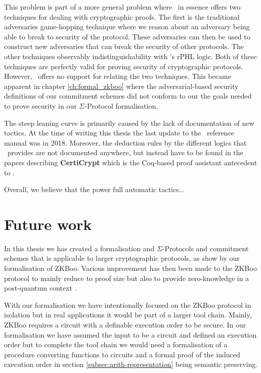 This problem is part of a more general problem where \easycrypt\ in essence
offers two techniques for dealing with cryptographic proofs. The first is the
traditional adversaries game-hopping technique where we reason about an
adversary being able to break to security of the protocol. These adversaries can
then be used to construct new adversaries that can break the security of other protocols.
The other techniques observably indistinguishability with \easycrypt's rPHL
logic.
Both of these techniques are perfectly valid for proving security of
cryptographic protocols. However, \easycrypt\ offers no support for relating the
two techniques. This became apparent in chapter \ref{ch:formal_zkboo} where the
adversarial-based security definitions of our commitment schemes did not conform
to our the goals needed to prove security in our $\Sigma$-Protocol formalisation.

The steep leaning curve is primarily caused by the lack of documentation of new
tactics. At the time of writing this thesis the last update to the \easycrypt\
reference manual \cite{ec_refman} was in 2018. Moreover, the deduction rules by
the different logics that \easycrypt\ provides are not documented anywhere, but
instead have to be found in the papers describing \textbf{CertiCrypt} which is
the Coq-based proof assistant antecedent to \easycrypt.

Overall, we believe that the power full automatic tactics...

\section{Future work}
\label{sec:future_work}
In this thesis we has created a formalisation and $\Sigma$-Protocols and
commitment schemes that is applicable to larger cryptographic protocols, as show
by our formalisation of ZKBoo. Various improvement has then been made to the
ZKBoo protocol to mainly reduce to proof size but also to provide zero-knowledge
in a post-quantum context \cite{zkb++}.

With our formalisation we have intentionally focused on the ZKBoo protocol in
isolation but in real applications it would be part of a larger tool chain.
Mainly, ZKBoo requires a circuit with a definable execution order to be secure.
In our formalisation we have assumed the input to be a circuit and defined an
execution order but to complete the tool chain we would need a formalisation of
a procedure converting functions to circuits and a formal proof of the induced
execution order in section \ref{subsec:arith-representation} being semantic preserving.

